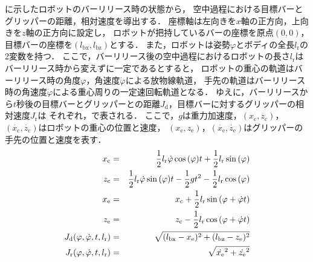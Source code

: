           に示したロボットのバーリリース時の状態から，
          空中過程における目標バーとグリッパーの距離，相対速度を導出する．
          座標軸は左向きを$x$軸の正方向，上向きを$z$軸の正方向に設定し，
          ロボットが把持しているバーの座標を原点$(0,0)$，
          目標バーの座標を$(l_{\mathrm{bx}},l_{\mathrm{bz}})$とする．
          また，ロボットは姿勢$\varphi$とボディの全長$l_{\mathrm{r}}$の2変数を持つ．         
          ここで，バーリリース後の空中過程におけるロボットの長さ$l_{\mathrm{r}}$は
          バーリリース時から変えずに一定であるとすると， 
          ロボットの重心の軌道はバーリリース時の角度$\varphi$，角速度$\dot{\varphi}$による放物線軌道，
          手先の軌道はバーリリース時の角速度$\dot{\varphi}$による重心周りの一定速回転軌道となる．
          ゆえに，バーリリースから$t$秒後の目標バーとグリッパーとの距離$J_{\mathrm{d}}$，目標バーに対するグリッパーの相対速度$J_{\mathrm{r}}$は
          それぞれ，で表される．
          ここで，$g$は重力加速度，$(x_{\mathrm{c}},z_{\mathrm{c}})$，$(\dot{x_{\mathrm{c}}},\dot{z_{\mathrm{c}}})$はロボットの重心の位置と速度，
          $(x_{\mathrm{e}},z_{\mathrm{e}})$，$(\dot{x_{\mathrm{e}}},\dot{z_{\mathrm{e}}})$はグリッパーの手先の位置と速度を表す．
          \begin{eqnarray}
            \equlabel{x-c}
            x_{\mathrm{c}}&=&\frac{1}{2}l_{\mathrm{r}}\dot{\varphi}\cos{(\varphi)}t+\frac{1}{2}l_{\mathrm{r}}\sin{(\varphi)}\\
            \equlabel{z-c}
            z_{\mathrm{c}}&=&\frac{1}{2}l_{\mathrm{r}}\dot{\varphi}\sin{(\varphi)}t-\frac{1}{2}gt^2-\frac{1}{2}l_{\mathrm{r}}\cos{(\varphi)}\\
            \equlabel{x-e}
            x_{\mathrm{e}}&=&x_{\mathrm{c}}+\frac{1}{2}l_{\mathrm{r}}\sin{(\varphi+\dot{\varphi}t)}\\
            \equlabel{z-e}
            z_{\mathrm{e}}&=&z_{\mathrm{c}}-\frac{1}{2}l_{\mathrm{r}}\cos{(\varphi+\dot{\varphi}t)}\\
            \equlabel{Jd}
              J_{\mathrm{d}}(\varphi,\dot{\varphi},t,l_{\mathrm{r}})
              &=&\sqrt{(l_{\mathrm{bx}}-x_{\mathrm{e}})^2+(l_{\mathrm{bz}}-z_{\mathrm{e}})^2}\\
            \equlabel{Jr}
            J_{\mathrm{r}}(\varphi,\dot{\varphi},t,l_{\mathrm{r}})
            &=&\sqrt{\dot{x_{\mathrm{e}}}^2+\dot{z_{\mathrm{e}}}^2}
          \end{eqnarray}  
        
          
        
